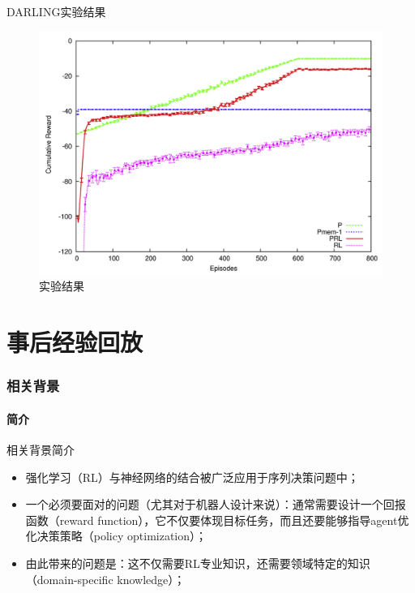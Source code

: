 \documentclass[10pt]{beamer}
\begin{document}
	\begin{frame}{DARLING}{实验结果}
		\begin{figure}
			\centering
			\includegraphics[width=0.6\linewidth]{pictures/darling-expr}
			\caption{实验结果}
			\label{fig:darling-expr}
		\end{figure}
	\end{frame}

	\part{事后经验回放}\label{part:her}
	
	\section{相关背景}
	
	\subsection{简介}
	
	\begin{frame}{相关背景}{简介}
		\begin{itemize}
			\item<2-> 强化学习（RL）与神经网络的结合被广泛应用于序列决策问题中；
			
			\item<3-> 一个必须要面对的问题（尤其对于机器人设计来说）：通常需要设计一个回报函数（reward function），它不仅要体现目标任务，而且还要能够指导agent优化决策策略（policy optimization）；
			
			\item<4-> 由此带来的问题是：这不仅需要RL专业知识，还需要领域特定的知识（domain-specific knowledge）；
			
		\end{itemize}
		
	\end{frame}
\end{document}
